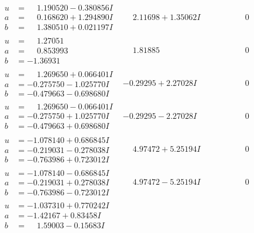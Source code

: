 \documentclass[1p]{elsarticle_modified}
\theoremstyle{definition}
\begin{document}
$$\begin{array}{c|c|c}
\begin{aligned}
u &= \phantom{-}1.190520 - 0.380856 I \\
a &= \phantom{-}0.168620 + 1.294890 I \\
b &= \phantom{-}1.380510 + 0.021197 I\end{aligned}
 & \phantom{-}2.11698 + 1.35062 I & \phantom{-0.000000 } 0 \\ \hline\begin{aligned}
u &= \phantom{-}1.27051\phantom{ +0.000000I} \\
a &= \phantom{-}0.853993\phantom{ +0.000000I} \\
b &= -1.36931\phantom{ +0.000000I}\end{aligned}
 & \phantom{-}1.81885\phantom{ +0.000000I} & \phantom{-0.000000 } 0 \\ \hline\begin{aligned}
u &= \phantom{-}1.269650 + 0.066401 I \\
a &= -0.275750 - 1.025770 I \\
b &= -0.479663 - 0.698680 I\end{aligned}
 & -0.29295 + 2.27028 I & \phantom{-0.000000 } 0 \\ \hline\begin{aligned}
u &= \phantom{-}1.269650 - 0.066401 I \\
a &= -0.275750 + 1.025770 I \\
b &= -0.479663 + 0.698680 I\end{aligned}
 & -0.29295 - 2.27028 I & \phantom{-0.000000 } 0 \\ \hline\begin{aligned}
u &= -1.078140 + 0.686845 I \\
a &= -0.219031 - 0.278038 I \\
b &= -0.763986 + 0.723012 I\end{aligned}
 & \phantom{-}4.97472 + 5.25194 I & \phantom{-0.000000 } 0 \\ \hline\begin{aligned}
u &= -1.078140 - 0.686845 I \\
a &= -0.219031 + 0.278038 I \\
b &= -0.763986 - 0.723012 I\end{aligned}
 & \phantom{-}4.97472 - 5.25194 I & \phantom{-0.000000 } 0 \\ \hline\begin{aligned}
u &= -1.037310 + 0.770242 I \\
a &= -1.42167 + 0.83458 I \\
b &= \phantom{-}1.59003 - 0.15683 I\end{aligned}

\end{array}$$
\end{document}

